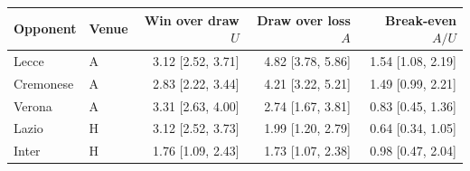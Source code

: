 \small
\begin{tabular}{llrrr}
\toprule
Opponent & Venue & Win over draw $U$ & Draw over loss $A$ & Break-even $A/U$ \\
\midrule
Lecce & A & 3.12 [2.52, 3.71] & 4.82 [3.78, 5.86] & 1.54 [1.08, 2.19] \\
Cremonese & A & 2.83 [2.22, 3.44] & 4.21 [3.22, 5.21] & 1.49 [0.99, 2.21] \\
Verona & A & 3.31 [2.63, 4.00] & 2.74 [1.67, 3.81] & 0.83 [0.45, 1.36] \\
Lazio & H & 3.12 [2.52, 3.73] & 1.99 [1.20, 2.79] & 0.64 [0.34, 1.05] \\
Inter & H & 1.76 [1.09, 2.43] & 1.73 [1.07, 2.38] & 0.98 [0.47, 2.04] \\
\bottomrule
\end{tabular}
